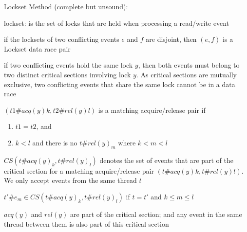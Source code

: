 \documentclass[landscape, a4paper]{article}
\begin{document}
\begin{minipage}[t]{0.2\linewidth}
\begin{betterlist}
\begin{betterlist}
\begin{betterlist}
			\end{betterlist}
		\end{betterlist}
		\item \alert{Lockset Method (complete but unsound)}:
		\begin{betterlist}
			\item \alert{lockset:} is the set of locks that are held when processing a read/write event
			\item if the locksets of two conflicting events $e$ and $f$ are \alert{disjoint}, then $(e, f)$ is a \alert{Lockset data race pair}
			\begin{betterlist}
				\item if two conflicting events hold the same lock $y$, then both events must belong to two distinct critical sections involving lock $y$. As critical sections are mutually exclusive, two conflicting events that share the same lock cannot be in a data race
			\end{betterlist}
			\item $(t1\#acq(y)k, t2\#rel(y)l)$ is a matching acquire/release pair if
			\begin{enumerate}
				\item $t1 = t2$, and
				\item $k < l$ and there is no $t\#rel(y)_m$ where $k < m < l$
			\end{enumerate}
			\item $CS(t\#acq(y)_k, t\#rel(y)_l)$ denotes the set of events that are part of the critical section for a matching acquire/release pair $(t\#acq(y)k, t\#rel(y)l)$. We only accept events from the same thread $t$
			\begin{betterlist}
				\item $t'\#e_m \in CS(t\#acq(y)_k, t\#rel(y)_l)$ if $t = t'$ and $k \le m \le l$
				\item $acq(y)$ and $rel(y)$ are part of the critical section; and any event in the same thread between them is also part of this critical section

\end{betterlist}
\end{betterlist}
\end{betterlist}
\end{minipage}
\end{document}
